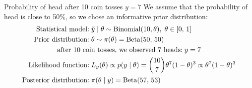 \begin{example}{Probability of head after 10 coin tosses $y=7$}{}
	We assume that the probability of head is close to 50\%, so we chose an
	informative prior distribution:
	\begin{alignat*}{1}
		\text{Statistical model:}      & \; \tilde y \mid \theta \sim \text{Binomial}(10, \theta), \; \theta \in [0,\,1] \\
		\text{Prior distribution:}     & \; \theta \sim \pi(\theta) = \text{Beta}(50,\,50)                               \\
		\span \text{after 10 coin tosses, we observed 7 heads:} \; y = 7                                                 \\
		\text{Likelihood function:}    & \; L_y(\theta) \propto p(y \mid \theta) = \binom{10}{7} \theta^7 (1-\theta)^3
		\propto \theta^7 (1-\theta)^3                                                                                    \\
		\text{Posterior distribution:} & \; \pi(\theta \mid y) = \text{Beta}(57,\,53)
	\end{alignat*}
	\begin{nscenter}
	\end{nscenter}
\end{example}

